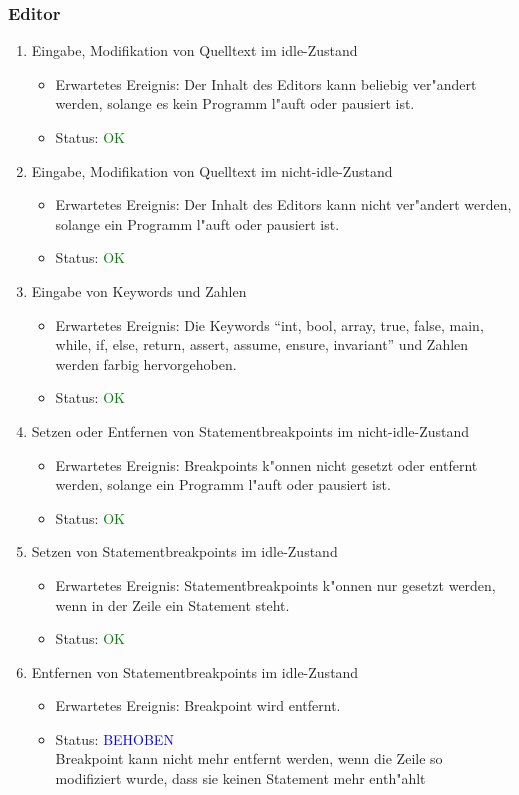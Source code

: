 \subsubsection{Editor}
\begin{enumerate}
\item Eingabe, Modifikation von Quelltext im idle-Zustand
\begin{itemize}
\item Erwartetes Ereignis: Der Inhalt des Editors kann beliebig ver"andert werden, solange es kein Programm l"auft oder pausiert ist. 
\item Status: \textcolor{green}{OK}
\end{itemize}
\item Eingabe, Modifikation von Quelltext im nicht-idle-Zustand
\begin{itemize}
\item Erwartetes Ereignis: Der Inhalt des Editors kann nicht ver"andert werden, solange ein Programm l"auft oder pausiert ist. 
\item Status: \textcolor{green}{OK}
\end{itemize}
\item Eingabe von Keywords und Zahlen
\begin{itemize}
\item Erwartetes Ereignis: Die Keywords "`int, bool, array, true, false, main, while, if, else, return, assert, assume, ensure, invariant"' und Zahlen werden farbig hervorgehoben. 
\item Status: \textcolor{green}{OK}
\end{itemize}
\item Setzen oder Entfernen von Statementbreakpoints im nicht-idle-Zustand
\begin{itemize}
\item Erwartetes Ereignis: Breakpoints k"onnen nicht gesetzt oder entfernt werden, solange ein Programm l"auft oder pausiert ist. 
\item Status: \textcolor{green}{OK}
\end{itemize}
\item Setzen von Statementbreakpoints im idle-Zustand
\begin{itemize}
\item Erwartetes Ereignis: Statementbreakpoints k"onnen nur gesetzt werden, wenn in der Zeile ein Statement steht.
\item Status: \textcolor{green}{OK}
\end{itemize}
\item Entfernen von Statementbreakpoints im idle-Zustand
\begin{itemize}
\item Erwartetes Ereignis: Breakpoint wird entfernt.
\item Status: \textcolor{blue}{BEHOBEN} \\
Breakpoint kann nicht mehr entfernt werden, wenn die Zeile so modifiziert wurde, dass sie keinen Statement mehr enth"ahlt
\end{itemize}
\end{enumerate}
